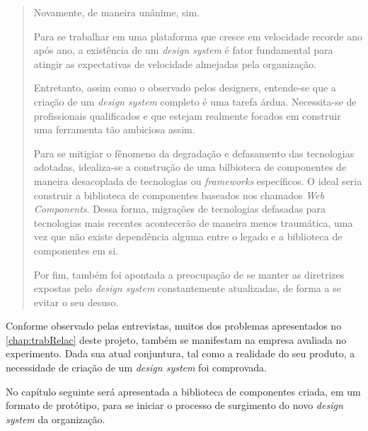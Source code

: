 \begin{quote}
    Novamente, de maneira unânime, sim.

    Para se trabalhar em uma plataforma que cresce em velocidade recorde ano após ano, a existência de um \textit{design system} é fator fundamental para atingir as expectativas de velocidade almejadas pela organização.
    
    Entretanto, assim como o observado pelos designers, entende-se que a criação de um \textit{design system} completo é uma tarefa árdua. Necessita-se de profissionais qualificados e que estejam realmente focados em construir uma ferramenta tão ambiciosa assim.
    
    Para se mitigiar o fênomeno da degradação e defasamento das tecnologias adotadas, idealiza-se a construção de uma bilbioteca de componentes de maneira desacoplada de tecnologias ou \textit{frameworks} específicos. O ideal seria construir a biblioteca de componentes baseados nos chamados \textit{Web Components}. Dessa forma, migrações de tecnologias defasadas para tecnologias mais recentes acontecerão de maneira menos traumática, uma vez que não existe dependência alguma entre o legado e a biblioteca de componentes em si.
    
    Por fim, também foi apontada a preocupação de se manter as diretrizes expostas pelo \textit{design system} constantemente atualizadas, de forma a se evitar o seu desuso.
\end{quote}

Conforme observado pelas entrevistas, muitos dos problemas apresentados no \autoref{chap:trabRelac} deste projeto, também se manifestam na empresa avaliada no experimento. Dada sua atual conjuntura, tal como a realidade do seu produto, a necessidade de criação de um \textit{design system} foi comprovada.

No capítulo seguinte será apresentada a biblioteca de componentes criada, em um formato de protótipo, para se iniciar o processo de surgimento do novo \textit{design system} da organização.
